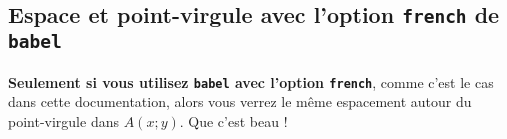 \documentclass[12pt,a4paper]{article}
\begin{document}

	\subsection{Espace et point-virgule avec l'option \texttt{french} de \texttt{babel}}

\textbf{Seulement si vous utilisez \texttt{babel} avec l'option \texttt{french}}, comme c'est le cas dans cette documentation, alors vous verrez le même espacement autour du point-virgule dans $A(x;y)$. Que c'est beau !
\end{document}
